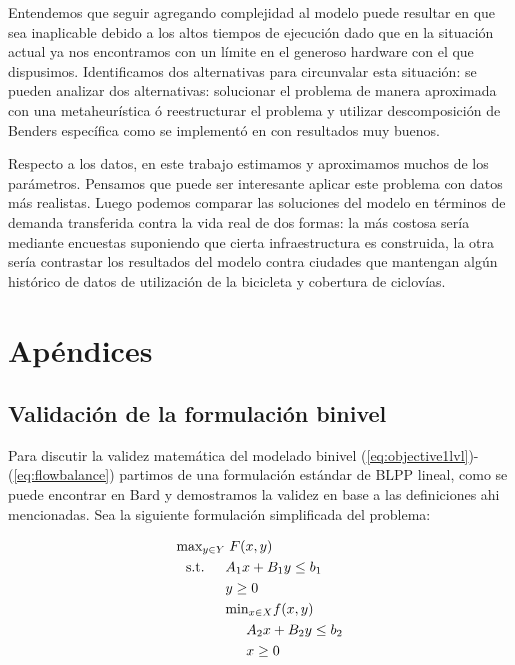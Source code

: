 \documentclass{article}
\newcommand{\modelspace}{\hspace{1.5em}}
\begin{document}
  Entendemos que seguir agregando complejidad al modelo puede resultar en que sea inaplicable debido a los altos tiempos de ejecución dado que en la situación actual ya nos encontramos con un límite en el generoso hardware con el que dispusimos. Identificamos dos alternativas para circunvalar esta situación: se pueden analizar dos alternativas: solucionar el problema de manera aproximada con una metaheurística ó reestructurar el problema y utilizar descomposición de Benders específica como se implementó en \cite{lim2021} con resultados muy buenos.

  Respecto a los datos, en este trabajo estimamos y aproximamos muchos de los parámetros. Pensamos que puede ser interesante aplicar este problema con datos más realistas. Luego podemos comparar las soluciones del modelo en términos de demanda transferida contra la vida real de dos formas: la más costosa sería mediante encuestas suponiendo que cierta infraestructura es construida, la otra sería contrastar los resultados del modelo contra ciudades que mantengan algún histórico de datos de utilización de la bicicleta y cobertura de ciclovías.

  \newpage
  \section{Apéndices}

  \subsection{Validación de la formulación binivel}
  \label{sect:apendixbilevelvalidation}

  Para discutir la validez matemática del modelado binivel (\ref{eq:objective1lvl})-(\ref{eq:flowbalance}) partimos de una formulación estándar de BLPP lineal, como se puede encontrar en Bard \cite{bardbook} y demostramos la validez en base a las definiciones ahi mencionadas.
  Sea la siguiente formulación simplificada del problema:

  \begin{align}
    \text{max}_{y \in Y}    & \; F(x, y) \label{bilevelgeneric1} \\
    \text{s.t.} \modelspace & A_1 x + B_1 y \leq b_1 \\
                            & y \geq 0 \\
                            & \text{min}_{x \in X} f(x, y) \\
                            & \modelspace A_2 x + B_2 y \leq b_2 \label{bilevelgeneric5} \\
                            & \modelspace x \geq 0 \label{bilevelgeneric6}
  \end{align}
\end{document}
